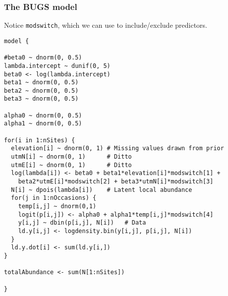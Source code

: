 \documentclass[color=usenames,dvipsnames]{beamer}\usepackage[]{graphicx}\usepackage[]{xcolor}
\makeatletter
\newenvironment{kframe}{%
 \def\at@end@of@kframe{}%
 \ifinner\ifhmode%
  \def\at@end@of@kframe{\end{minipage}}%
  \begin{minipage}{\columnwidth}%
 \fi\fi%
 \def\FrameCommand##1{\hskip\@totalleftmargin \hskip-\fboxsep
 \colorbox{shadecolor}{##1}\hskip-\fboxsep
     \hskip-\linewidth \hskip-\@totalleftmargin \hskip\columnwidth}%
 \MakeFramed {\advance\hsize-\width
   \@totalleftmargin\z@ \linewidth\hsize
   \@setminipage}}%
 {\par\unskip\endMakeFramed%
 \at@end@of@kframe}
\newenvironment{knitrout}{}{} %
\makeatother
\begin{document}
\begin{frame}[fragile]
  \frametitle{The BUGS model}
  \small
  Notice \alert{\tt modswitch}, which we can use to include/exclude
  predictors. 
  \tiny
\begin{knitrout}\tiny
{}\color{fgcolor}\begin{kframe}
\begin{verbatim}
model {

#beta0 ~ dnorm(0, 0.5)  
lambda.intercept ~ dunif(0, 5)
beta0 <- log(lambda.intercept)
beta1 ~ dnorm(0, 0.5)
beta2 ~ dnorm(0, 0.5)
beta3 ~ dnorm(0, 0.5)

alpha0 ~ dnorm(0, 0.5)  
alpha1 ~ dnorm(0, 0.5)

for(i in 1:nSites) {
  elevation[i] ~ dnorm(0, 1) # Missing values drawn from prior
  utmN[i] ~ dnorm(0, 1)      # Ditto
  utmE[i] ~ dnorm(0, 1)      # Ditto
  log(lambda[i]) <- beta0 + beta1*elevation[i]*modswitch[1] +
    beta2*utmE[i]*modswitch[2] + beta3*utmN[i]*modswitch[3] 
  N[i] ~ dpois(lambda[i])    # Latent local abundance
  for(j in 1:nOccasions) {
    temp[i,j] ~ dnorm(0,1)
    logit(p[i,j]) <- alpha0 + alpha1*temp[i,j]*modswitch[4]
    y[i,j] ~ dbin(p[i,j], N[i])   # Data
    ld.y[i,j] <- logdensity.bin(y[i,j], p[i,j], N[i])
  }
  ld.y.dot[i] <- sum(ld.y[i,])
}

totalAbundance <- sum(N[1:nSites])

}
\end{verbatim}
\end{kframe}
\end{knitrout}

\end{frame}
\end{document}
